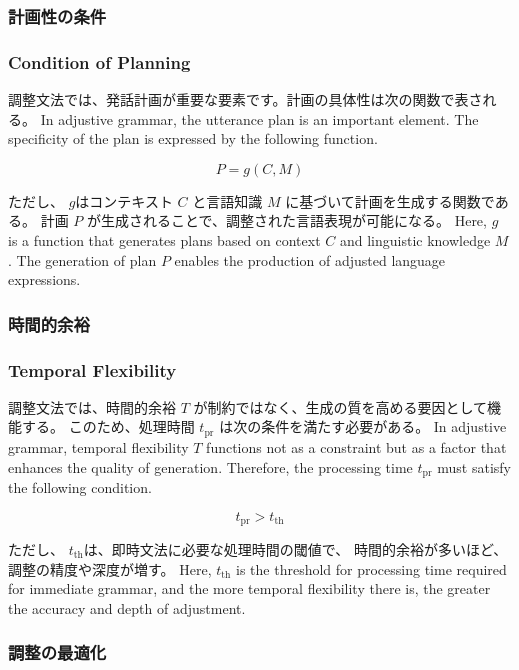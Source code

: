 \documentclass[a4paper,xelatex,ja=standard]{bxjsarticle}
\begin{document}
\ifJPN
\subsubsection{計画性の条件}
\else
\subsubsection{Condition of Planning}
\fi

\ifJPN
調整文法では、発話計画が重要な要素です。計画の具体性は次の関数で表される。
\else
In adjustive grammar, the utterance plan is an important element. The specificity of the plan is expressed by the following function.
\fi

\[
P = g(C, M)
\]

\ifJPN
ただし、
\( g \)はコンテキスト \( C \) と言語知識 \( M \) に基づいて計画を生成する関数である。
計画 \( P \) が生成されることで、調整された言語表現が可能になる。
\else
Here, \( g \) is a function that generates plans based on context \( C \) and linguistic knowledge \( M \).
The generation of plan \( P \) enables the production of adjusted language expressions.
\fi

\ifJPN
\subsubsection{時間的余裕}
\else
\subsubsection{Temporal Flexibility}
\fi

\ifJPN
調整文法では、時間的余裕 \( T \) が制約ではなく、生成の質を高める要因として機能する。
このため、処理時間 \( t_{\text{pr}} \) は次の条件を満たす必要がある。
\else
In adjustive grammar, temporal flexibility \( T \) functions not as a constraint but as a factor that enhances the quality of generation.
Therefore, the processing time \( t_{\text{pr}} \) must satisfy the following condition.
\fi

\[
t_{\text{pr}} > t_{\text{th}}
\]

\ifJPN
ただし、
\( t_{\text{th}} \)は、即時文法に必要な処理時間の閾値で、
時間的余裕が多いほど、調整の精度や深度が増す。
\else
  Here, \( t_{\text{th}} \) is the threshold for processing time required for immediate grammar, and the more temporal flexibility there is, the greater the accuracy and depth of adjustment.
\fi

\ifJPN
\subsubsection{調整の最適化}
\else
\end{document}
